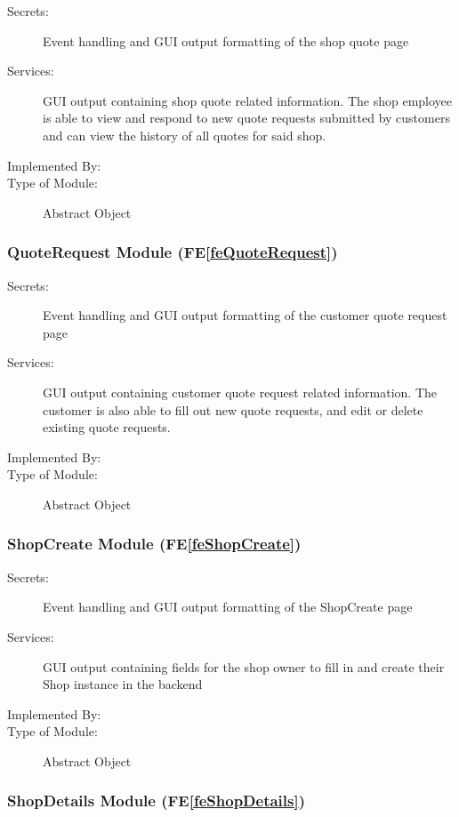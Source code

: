 \documentclass[12pt, titlepage]{article}
\newcommand{\feref}[1]{FE\ref{#1}}
\newcommand{\labelfedef}[1]{\label{fe#1def}}
\begin{document}
\begin{description}
\item[Secrets:] Event handling and GUI output formatting of the shop quote page
\item[Services:] GUI output containing shop quote related information. The shop employee is able to view and respond to new quote requests submitted by customers and can view the history of all quotes for said shop.
\item[Implemented By:] \progname
\item[Type of Module:] Abstract Object
\end{description}

\subsubsection{QuoteRequest Module (\feref{feQuoteRequest}) \labelfedef{QuoteRequest}}

\begin{description}
\item[Secrets:] Event handling and GUI output formatting of the customer quote request page
\item[Services:] GUI output containing customer quote request related information. The customer is also able to fill out new quote requests, and edit or delete existing quote requests.
\item[Implemented By:] \progname
\item[Type of Module:] Abstract Object
\end{description}

\subsubsection{ShopCreate Module (\feref{feShopCreate}) \labelfedef{ShopCreate}}

\begin{description}
    \item[Secrets:] Event handling and GUI output formatting of the ShopCreate page
    \item[Services:] GUI output containing fields for the shop owner to fill in and create their Shop instance in the backend
    \item[Implemented By:] \progname
    \item[Type of Module:] Abstract Object
\end{description}

\subsubsection{ShopDetails Module (\feref{feShopDetails}) \labelfedef{ShopDetails}}
\end{document}
